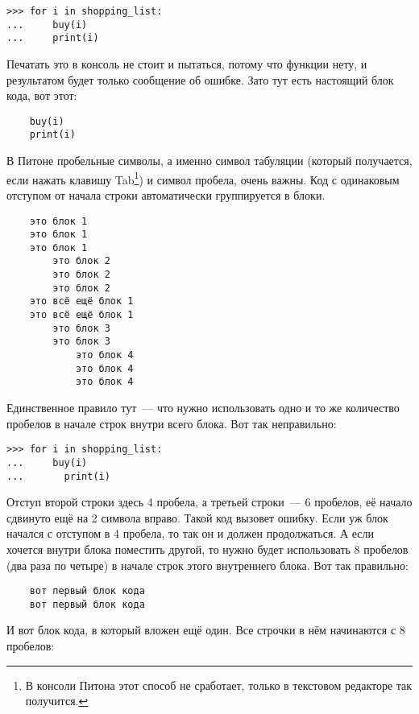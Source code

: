 \begin{verbatim}
>>> for i in shopping_list:
...     buy(i)
...     print(i)
\end{verbatim}

Печатать это в консоль не стоит и пытаться, потому что функции  нету, и результатом будет только сообщение об ошибке. Зато тут есть настоящий блок кода, вот этот:

\begin{verbatim}
    buy(i)
    print(i)
\end{verbatim}

В Питоне пробельные символы, а именно символ табуляции (который получается, если нажать клавишу Tab\footnote{В консоли Питона этот способ не сработает, только в текстовом редакторе так получится.}) и символ пробела, очень важны. Код с одинаковым отступом от начала строки автоматически группируется в блоки.

\begin{listing}
\begin{verbatim}
	это блок 1
	это блок 1
	это блок 1
	    это блок 2
	    это блок 2
	    это блок 2
	это всё ещё блок 1
	это всё ещё блок 1
	    это блок 3
	    это блок 3
	        это блок 4
	        это блок 4
	        это блок 4
\end{verbatim}
\end{listing}

Единственное правило тут — что нужно использовать одно и то же количество пробелов в начале строк внутри всего блока. Вот так неправильно:

\begin{verbatim}
>>> for i in shopping_list:
...     buy(i)
...       print(i)
\end{verbatim}

Отступ второй строки здесь 4 пробела, а третьей строки — 6 пробелов, её начало сдвинуто ещё на 2 символа вправо. Такой код вызовет ошибку. Если уж блок начался с отступом в 4 пробела, то так он и должен продолжаться. А если хочется внутри блока поместить другой, то нужно будет использовать 8 пробелов (два раза по четыре) в начале строк этого внутреннего блока. Вот так правильно:

\begin{listing}
\begin{verbatim}
    вот первый блок кода
    вот первый блок кода
\end{verbatim}
\end{listing}

И вот блок кода, в который вложен ещё один. Все строчки в нём начинаются с 8 пробелов:

